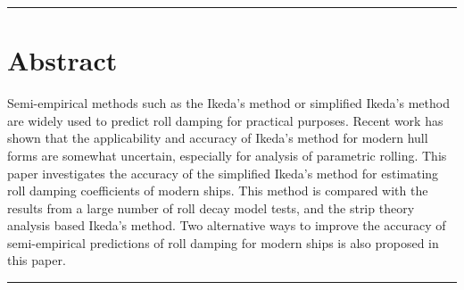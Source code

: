 {\footnotesize
\noindent\rule{\columnwidth}{0.4pt}
\section*{Abstract}\label{se:abstract}
Semi-empirical methods such as the Ikeda’s method or simplified Ikeda’s method are widely used to predict roll damping for practical purposes. Recent work has shown that the applicability and accuracy of Ikeda’s method for modern hull forms are somewhat uncertain, especially for analysis of parametric rolling. 
This paper investigates the accuracy of the simplified Ikeda's method for estimating roll damping coefficients of modern ships. This method is compared with the results from a large number of roll decay model tests, and the strip theory analysis based Ikeda's method. Two alternative ways to improve the accuracy of semi-empirical predictions of roll damping for modern ships is also proposed in this paper.

}
\newline
\noindent\rule{\columnwidth}{0.4pt}